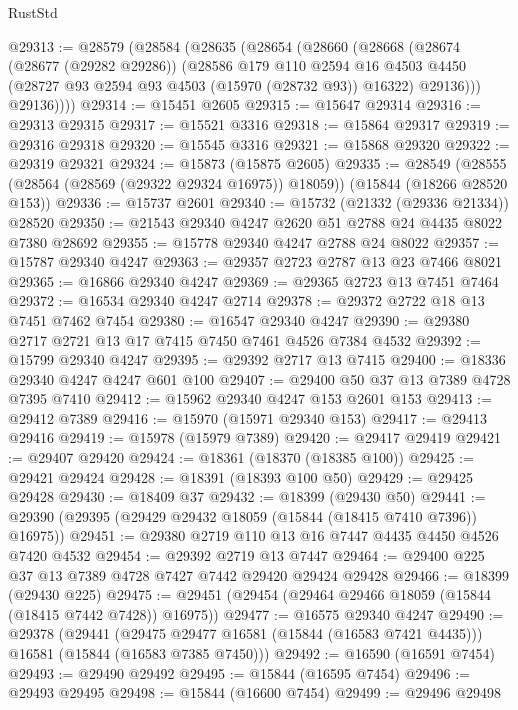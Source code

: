\begin{lexlean}{RustStd}
\begin{coremodule}
@29313 := @28579
    (@28584
      (@28635
        (@28654
          (@28660
            (@28668
              (@28674
                (@28677 (@29282 @29286))
                (@28586
                  @179
                  @110
                  @2594
                  @16
                  @4503
                  @4450
                  (@28727 @93 @2594 @93 @4503 (@15970 (@28732 @93)) @16322)
                  @29136)))
            @29136))))
@29314 := @15451 @2605
@29315 := @15647 @29314
@29316 := @29313 @29315
@29317 := @15521 @3316
@29318 := @15864 @29317
@29319 := @29316 @29318
@29320 := @15545 @3316
@29321 := @15868 @29320
@29322 := @29319 @29321
@29324 := @15873 (@15875 @2605)
@29335 := @28549
    (@28555 (@28564 (@28569 (@29322 @29324 @16975)) @18059))
    (@15844 (@18266 @28520 @153))
@29336 := @15737 @2601
@29340 := @15732 (@21332 (@29336 @21334)) @28520
@29350 := @21543 @29340 @4247 @2620 @51 @2788 @24 @4435 @8022 @7380 @28692
@29355 := @15778 @29340 @4247 @2788 @24 @8022
@29357 := @15787 @29340 @4247
@29363 := @29357 @2723 @2787 @13 @23 @7466 @8021
@29365 := @16866 @29340 @4247
@29369 := @29365 @2723 @13 @7451 @7464
@29372 := @16534 @29340 @4247 @2714
@29378 := @29372 @2722 @18 @13 @7451 @7462 @7454
@29380 := @16547 @29340 @4247
@29390 := @29380 @2717 @2721 @13 @17 @7415 @7450 @7461 @4526 @7384 @4532
@29392 := @15799 @29340 @4247
@29395 := @29392 @2717 @13 @7415
@29400 := @18336 @29340 @4247 @4247 @601 @100
@29407 := @29400 @50 @37 @13 @7389 @4728 @7395 @7410
@29412 := @15962 @29340 @4247 @153 @2601 @153
@29413 := @29412 @7389
@29416 := @15970 (@15971 @29340 @153)
@29417 := @29413 @29416
@29419 := @15978 (@15979 @7389)
@29420 := @29417 @29419
@29421 := @29407 @29420
@29424 := @18361 (@18370 (@18385 @100))
@29425 := @29421 @29424
@29428 := @18391 (@18393 @100 @50)
@29429 := @29425 @29428
@29430 := @18409 @37
@29432 := @18399 (@29430 @50)
@29441 := @29390 (@29395 (@29429 @29432 @18059 (@15844 (@18415 @7410 @7396)) @16975))
@29451 := @29380 @2719 @110 @13 @16 @7447 @4435 @4450 @4526 @7420 @4532
@29454 := @29392 @2719 @13 @7447
@29464 := @29400 @225 @37 @13 @7389 @4728 @7427 @7442 @29420 @29424 @29428
@29466 := @18399 (@29430 @225)
@29475 := @29451 (@29454 (@29464 @29466 @18059 (@15844 (@18415 @7442 @7428)) @16975))
@29477 := @16575 @29340 @4247
@29490 := @29378
    (@29441
      (@29475 @29477 @16581 (@15844 (@16583 @7421 @4435)))
      @16581
      (@15844 (@16583 @7385 @7450)))
@29492 := @16590 (@16591 @7454)
@29493 := @29490 @29492
@29495 := @15844 (@16595 @7454)
@29496 := @29493 @29495
@29498 := @15844 (@16600 @7454)
@29499 := @29496 @29498

\end{coremodule}
\end{lexlean}
